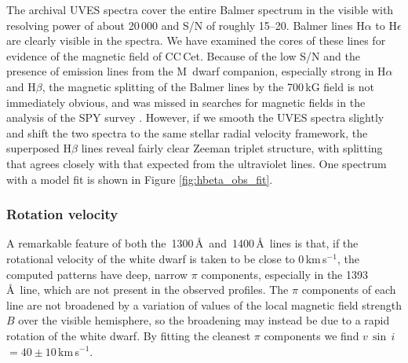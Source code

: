 \documentclass[fleqn,usenatbib]{mnras}
\newcommand{\vsini}{\ensuremath{v\,\sin\,i}}
\newcommand{\kms}{km\,s$^{-1}$}
\begin{document}
The archival UVES spectra cover the entire Balmer spectrum in the visible with resolving power of about 20\,000 and S/N of roughly 15--20. Balmer lines H$\alpha$ to H$\epsilon$ are clearly visible in the spectra. We have examined the cores of these lines for evidence of the magnetic field of CC\,Cet. Because of the low S/N and the presence of emission lines from the M~dwarf companion, especially strong in H$\alpha$ and H$\beta$, the magnetic splitting of the Balmer lines by the 700\,kG field is not immediately obvious, and was missed in searches for magnetic fields in the analysis of the SPY survey \citep{napiwotzkietal20-1, koesteretal09-2}. However, if we smooth the UVES spectra slightly and shift the two spectra to the same stellar radial velocity framework, the superposed H$\beta$ lines reveal fairly clear Zeeman triplet structure, with splitting that agrees closely with that expected from the ultraviolet lines. One spectrum with a model fit is shown in Figure \ref{fig:hbeta_obs_fit}.

\subsubsection{Rotation velocity}
\label{sec:rotation}

A remarkable feature of both the \,1300\,\AA\ and \,1400\,\AA\ lines is that, if the rotational velocity of the white dwarf is taken to be close to 0\,\kms, the computed patterns have deep, narrow $\pi$ components, especially in the 1393\,\AA\ line, which are not present in the observed profiles. The $\pi$ components of each line are not broadened by a variation of values of the local magnetic field strength $B$ over the visible hemisphere, so the broadening may instead be due to a rapid rotation of the white dwarf. By fitting the cleanest $\pi$ components we find \vsini$= 40 \pm 10$\,\kms.
\end{document}
